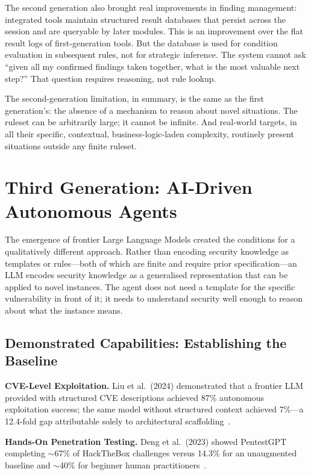 \documentclass[12pt,a4paper,oneside,openany]{book}
\begin{document}
The second generation also brought real improvements in finding management: integrated tools maintain structured result databases that persist across the session and are queryable by later modules. This is an improvement over the flat result logs of first-generation tools. But the database is used for condition evaluation in subsequent rules, not for strategic inference. The system cannot ask ``given all my confirmed findings taken together, what is the most valuable next step?'' That question requires reasoning, not rule lookup.

The second-generation limitation, in summary, is the same as the first generation's: the absence of a mechanism to reason about novel situations. The ruleset can be arbitrarily large; it cannot be infinite. And real-world targets, in all their specific, contextual, business-logic-laden complexity, routinely present situations outside any finite ruleset.

\section{Third Generation: AI-Driven Autonomous Agents}
\label{sec:gen3}

The emergence of frontier Large Language Models created the conditions for a qualitatively different approach. Rather than encoding security knowledge as templates or rules---both of which are finite and require prior specification---an LLM encodes security knowledge as a generalised representation that can be applied to novel instances. The agent does not need a template for the specific vulnerability in front of it; it needs to understand security well enough to reason about what the instance means.

\subsection{Demonstrated Capabilities: Establishing the Baseline}

\textbf{CVE-Level Exploitation.} Liu et al.\ (2024) demonstrated that a frontier LLM provided with structured CVE descriptions achieved 87\% autonomous exploitation success; the same model without structured context achieved 7\%---a 12.4-fold gap attributable solely to architectural scaffolding~\citep{liu2024gpts}.

\textbf{Hands-On Penetration Testing.} Deng et al.\ (2023) showed PentestGPT completing $\sim$67\% of HackTheBox challenges versus 14.3\% for an unaugmented baseline and $\sim$40\% for beginner human practitioners~\citep{deng2024pentestgpt}.
\end{document}
